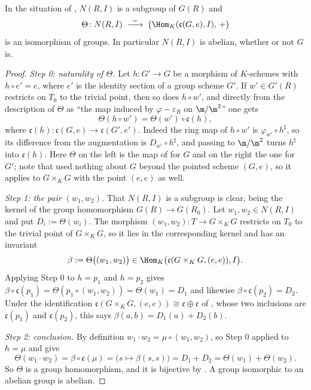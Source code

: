 \begin{lemma}\label{lem:av-kernel-group-law}
In the situation of , $N(R,I)$ is a subgroup of
$G(R)$ and
\[
  \Theta\colon N(R,I)\;\xrightarrow{\ \sim\ }\;
  \bigl(\Hom_K(\mathfrak c(G,e),I),\,+\bigr)
\]
is an isomorphism of groups.  In particular $N(R,I)$ is abelian, whether or not
$G$ is.
\end{lemma}
\begin{proof}
\emph{Step 0: naturality of $\Theta$.}  Let $h\colon G'\to G$ be a morphism of
$K$-schemes with $h\circ e'=e$, where $e'$ is the identity section of a group
scheme $G'$.  If $w'\in G'(R)$ restricts on $T_0$ to the trivial point, then so
does $h\circ w'$, and directly from the description of $\Theta$ as ``the map
induced by $\varphi-\varepsilon_R$ on $\m/\m^2$'' one gets
\[
  \Theta(h\circ w')=\Theta(w')\circ\mathfrak c(h),
\]
where $\mathfrak c(h)\colon\mathfrak c(G,e)\to\mathfrak c(G',e')$.  Indeed the
ring map of $h\circ w'$ is $\varphi_{w'}\circ h^\sharp$, so its difference from
the augmentation is $D_{w'}\circ h^\sharp$, and passing to $\m/\m^2$ turns
$h^\sharp$ into $\mathfrak c(h)$.  Here $\Theta$ on the left is the map of
 for $G$ and on the right the one for $G'$; note
that  used nothing about $G$ beyond the pointed
scheme $(G,e)$, so it applies to $G\times_KG$ with the point $(e,e)$ as well.

\emph{Step 1: the pair $(w_1,w_2)$.}  That $N(R,I)$ is a subgroup is clear,
being the kernel of the group homomorphism $G(R)\to G(R_0)$.  Let
$w_1,w_2\in N(R,I)$ and put $D_i:=\Theta(w_i)$.  The morphism
$(w_1,w_2)\colon T\to G\times_KG$ restricts on $T_0$ to the trivial point of
$G\times_KG$, so it lies in the corresponding kernel and has an invariant
\[
  \beta:=\Theta\bigl((w_1,w_2)\bigr)\in
  \Hom_K\bigl(\mathfrak c(G\times_KG,(e,e)),I\bigr).
\]
Applying Step 0 to $h=p_1$ and $h=p_2$ gives
$\beta\circ\mathfrak c(p_1)=\Theta(p_1\circ(w_1,w_2))=\Theta(w_1)=D_1$ and
likewise $\beta\circ\mathfrak c(p_2)=D_2$.  Under the identification
$\mathfrak c(G\times_KG,(e,e))\cong\mathfrak c\oplus\mathfrak c$ of
, whose two inclusions are $\mathfrak c(p_1)$
and $\mathfrak c(p_2)$, this says $\beta(a,b)=D_1(a)+D_2(b)$.

\emph{Step 2: conclusion.}  By definition $w_1\cdot w_2=\mu\circ(w_1,w_2)$, so
Step 0 applied to $h=\mu$ and  give
\[
  \Theta(w_1\cdot w_2)=\beta\circ\mathfrak c(\mu)
  =\bigl(s\mapsto\beta(s,s)\bigr)=D_1+D_2=\Theta(w_1)+\Theta(w_2).
\]
So $\Theta$ is a group homomorphism, and it is bijective by
.  A group isomorphic to an abelian group is
abelian.
\end{proof}

